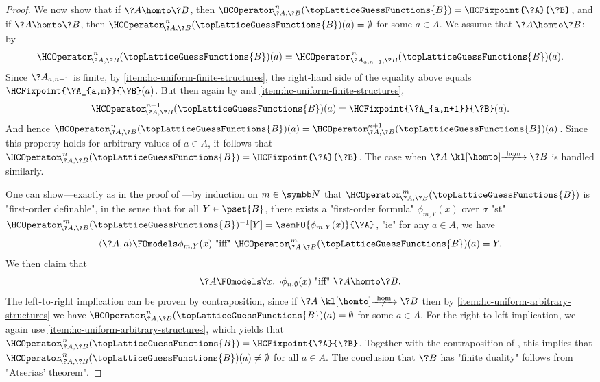 \begin{proof}
	We now show that if $\?A\homto \?B$, then
	$\HCOperator^{\,n}_{\!\?A,\?B}(\topLatticeGuessFunctions{B}) =
	\HCFixpoint{\?A}{\?B}$,
	and if $\?A\homto\?B$, then
	$\HCOperator^{\,n}_{\!\?A,\?B}(\topLatticeGuessFunctions{B})(a) = \emptyset$ for some $a\in A$.
	We assume that $\?A\homto \?B$: by 
	\[\HCOperator^{\,n}_{\!\?A,\?B}(\topLatticeGuessFunctions{B})(a) =
	\HCOperator^{\,n}_{\?A_{a,n+1},\?B}(\topLatticeGuessFunctions{B})(a).\]
	Since $\?A_{a,n+1}$ is finite, by \eqref{item:hc-uniform-finite-structures}, the right-hand side
	of the equality above equals $\HCFixpoint{\?A_{a,m}}{\?B}(a)$.
	But then again by  and \eqref{item:hc-uniform-finite-structures}, 
	\[\HCOperator^{n+1}_{\!\?A,\?B}(\topLatticeGuessFunctions{B})(a) = \HCFixpoint{\?A_{a,n+1}}{\?B}(a).\]
	And hence $\HCOperator^{\,n}_{\!\?A,\?B}(\topLatticeGuessFunctions{B})(a) = \HCOperator^{n+1}_{\!\?A,\?B}(\topLatticeGuessFunctions{B})(a)$. Since this property holds
	for arbitrary values of $a\in A$, it follows that $\HCOperator^{\,n}_{\!\?A,\?B}(\topLatticeGuessFunctions{B}) = \HCFixpoint{\?A}{\?B}$. 
	The case when $\?A\nothomto\?B$ is handled similarly.

	One can show---exactly as in the proof
	of ---by induction on $m \in \N$
	that $\HCOperator^{\,m}_{\!\?A,\?B}(\topLatticeGuessFunctions{B})$
	is "first-order definable", in the sense that for all $Y \in \pset{B}$,
	there exists a "first-order formula" $\phi_{m,Y}(x)$ over $\sigma$ "st"
	$\HCOperator^{\,m}_{\!\?A,\?B}(\topLatticeGuessFunctions{B})^{-1}[Y] = \semFO{\phi_{m,Y}(x)}{\?A}$,
	"ie" for any $a\in A$, we have
	\[
		\langle \?A, a\rangle \FOmodels \phi_{m,Y}(x)
		\text{ "iff" }
		\HCOperator^{\,m}_{\!\?A,\?B}(\topLatticeGuessFunctions{B})(a) = Y.
	\]
	We then claim that
	\[
		\?A \FOmodels \forall x. \neg \phi_{n,\emptyset}(x)
		\text{ "iff" }
		\?A \homto \?B.
	\]
	The left-to-right implication can be proven by contraposition, 
	since if $\?A \nothomto \?B$ then by \eqref{item:hc-uniform-arbitrary-structures}
	we have $\HCOperator^{\,n}_{\!\?A,\?B}(\topLatticeGuessFunctions{B})(a) = \emptyset$
	for some $a \in A$.
	For the right-to-left implication, we again use \eqref{item:hc-uniform-arbitrary-structures}, 
	which yields that $\HCOperator^{\,n}_{\!\?A,\?B}(\topLatticeGuessFunctions{B}) = \HCFixpoint{\?A}{\?B}$. Together with the contraposition of ,
	this implies that $\HCOperator^{\,n}_{\!\?A,\?B}(\topLatticeGuessFunctions{B})(a) \neq \emptyset$ for all $a\in A$. The conclusion that
	$\?B$ has "finite duality" follows from "Atserias' theorem".


\end{proof}
